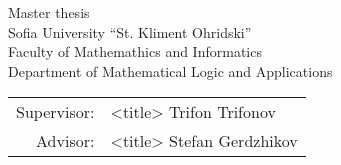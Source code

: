 \documentclass[main.tex]{subfiles}
\begin{document}
\maketitle

\begin{center}
    \large
    Master thesis \\
    \vspace{3cm}
    Sofia University ``St. Kliment Ohridski'' \\
    Faculty of Mathemathics and Informatics \\
    Department of Mathematical Logic and Applications
    \vspace{4cm}

    \begin{tabular}{r l}
        Supervisor: & <title> Trifon Trifonov \\
        Advisor: & <title> Stefan Gerdzhikov \\
    \end{tabular}
\end{center}
\thispagestyle{empty}

\pagebreak
\printtoc
\pagebreak
\end{document}
